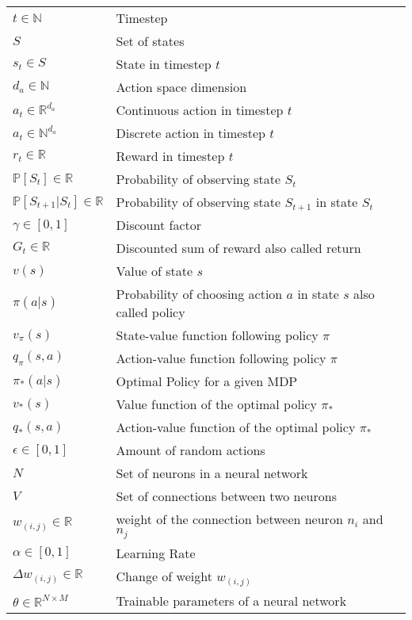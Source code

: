 \bgroup
\def\arraystretch{1.5}%
\begin{longtable}{p{} p{}}
  $t \in \mathbb{N}$ & Timestep \\
  $S$ & Set of states\\
  $s_t \in S$ & State in timestep $t$\\
  $d_a \in \mathbb{N}$ & Action space dimension\\
  $a_t \in \mathbb{R}^{d_a}$ & Continuous action in timestep $t$\\
  $a_t \in \mathbb{N}^{d_a}$ & Discrete action in timestep $t$\\
  $r_t \in \mathbb{R}$ & Reward in timestep $t$\\
  $\mathbb{P}[S_t] \in \mathbb{R}$ & Probability of observing state $S_t$\\
  $\mathbb{P}[S_{t+1} | S_t] \in \mathbb{R}$ & Probability of observing state $S_{t+1}$ in state $S_t$\\
  $\gamma \in [0,1]$ & Discount factor\\
  $G_t \in \mathbb{R}$ & Discounted sum of reward also called return\\
  $v(s)$ & Value of state $s$\\
  $\pi(a|s)$ & Probability of choosing action $a$ in state $s$ also called policy\\
  $v_\pi(s)$ & State-value function following policy $\pi$\\
  $q_\pi(s,a)$ & Action-value function following policy $\pi$\\
  $\pi_*(a|s)$ & Optimal Policy for a given MDP\\
  $v_*(s)$ & Value function of the optimal policy $\pi_*$\\
  $q_*(s,a)$ & Action-value function of the optimal policy $\pi_*$\\
  $\epsilon \in [0,1]$ & Amount of random actions\\
  $N$ & Set of neurons in a neural network\\
  $V$ & Set of connections between two neurons\\
  $w_{(i,j)} \in \mathbb{R}$ & weight of the connection between neuron $n_i$ and $n_j$\\
  $\alpha \in [0,1]$ & Learning Rate\\
  $\Delta w_{(i,j)} \in \mathbb{R}$ & Change of weight $w_{(i,j)}$\\
  $\theta \in \mathbb{R}^{N \times M}$ & Trainable parameters of a neural network\\

\end{longtable}
